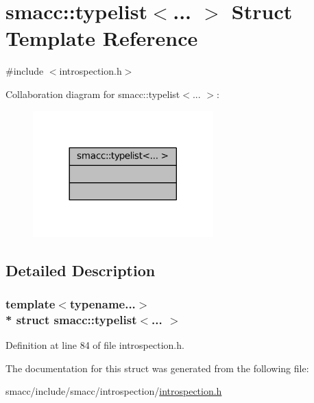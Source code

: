 \hypertarget{structsmacc_1_1typelist}{}\section{smacc\+:\+:typelist$<$... $>$ Struct Template Reference}
\label{structsmacc_1_1typelist}


{\ttfamily \#include $<$introspection.\+h$>$}



Collaboration diagram for smacc\+:\+:typelist$<$... $>$\+:
\nopagebreak
\begin{figure}[H]
\begin{center}
\leavevmode
\includegraphics[width=197pt]{structsmacc_1_1typelist__coll__graph}
\end{center}
\end{figure}


\subsection{Detailed Description}
\subsubsection*{template$<$typename...$>$\\*
struct smacc\+::typelist$<$... $>$}



Definition at line 84 of file introspection.\+h.



The documentation for this struct was generated from the following file\+:\begin{DoxyCompactItemize}
\item 
smacc/include/smacc/introspection/\hyperlink{introspection_8h}{introspection.\+h}\end{DoxyCompactItemize}
